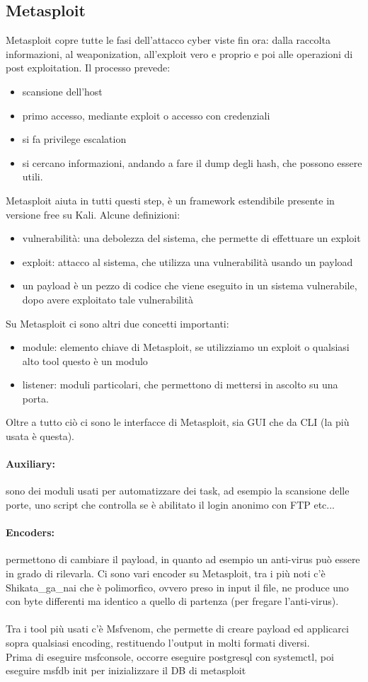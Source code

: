 \documentclass{article}
\begin{document}
\subsection{Metasploit}
Metasploit copre tutte le fasi dell'attacco cyber viste fin ora: dalla raccolta informazioni, al weaponization, all'exploit vero e proprio e poi alle operazioni di post exploitation. Il processo prevede:
\begin{itemize}
\item scansione dell'host
\item primo accesso, mediante exploit o accesso con credenziali
\item si fa privilege escalation
\item si cercano informazioni, andando a fare il dump degli hash, che possono essere utili.
\end{itemize}
Metasploit aiuta in tutti questi step, è un framework estendibile presente in versione free su Kali. Alcune definizioni:
\begin{itemize}
\item vulnerabilità: una debolezza del sistema, che permette di effettuare un exploit
\item exploit: attacco al sistema, che utilizza una vulnerabilità usando un payload
\item un payload è un pezzo di codice che viene eseguito in un sistema vulnerabile, dopo avere exploitato tale vulnerabilità
\end{itemize}
Su Metasploit ci sono altri due concetti importanti:
\begin{itemize}
\item module: elemento chiave di Metasploit, se utilizziamo un exploit o qualsiasi alto tool questo è un modulo
\item listener: moduli particolari, che permettono di mettersi in ascolto su una porta.
\end{itemize}
Oltre a tutto ciò ci sono le interfacce di Metasploit, sia GUI che da CLI (la più usata è questa).
\paragraph{Auxiliary:}sono dei moduli usati per automatizzare dei task, ad esempio la scansione delle porte, uno script che controlla se è abilitato il login anonimo con FTP etc...
\paragraph{Encoders:}permettono di cambiare il payload, in quanto ad esempio un anti-virus può essere in grado di rilevarla. Ci sono vari encoder su Metasploit, tra i più noti c'è Shikata\_ga\_nai che è polimorfico, ovvero preso in input il file, ne produce uno con byte differenti ma identico a quello di partenza (per fregare l'anti-virus).\\\\ Tra i tool più usati c'è Msfvenom, che permette di creare payload ed applicarci sopra qualsiasi encoding, restituendo l'output in molti formati diversi.\\ Prima di eseguire msfconsole, occorre eseguire postgresql con \textsf{systemctl}, poi eseguire \textsf{msfdb init} per inizializzare il DB di metasploit
\end{document}

